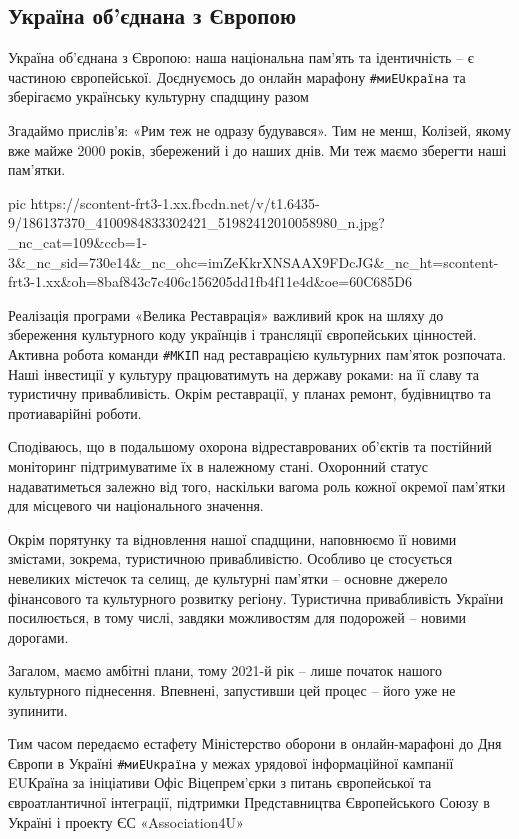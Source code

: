  
 
 
 
 
\subsection{Україна об'єднана з Європою}

Україна об'єднана з Європою: наша національна пам'ять та ідентичність – є
частиною європейської. Доєднуємось до онлайн марафону \verb|#миEUкраїна| та зберігаємо
українську культурну спадщину разом 

Згадаймо прислів'я: «Рим теж не одразу будувався». Тим не менш, Колізей, якому
вже майже 2000 років, збережений і до наших днів. Ми теж маємо зберегти наші
пам'ятки.

\ifcmt
  pic https://scontent-frt3-1.xx.fbcdn.net/v/t1.6435-9/186137370_4100984833302421_51982412010058980_n.jpg?_nc_cat=109&ccb=1-3&_nc_sid=730e14&_nc_ohc=imZeKkrXNSAAX9FDcJG&_nc_ht=scontent-frt3-1.xx&oh=8baf843c7c406c156205dd1fb4f11e4d&oe=60C685D6
\fi

Реалізація  програми «Велика Реставрація» важливий крок на шляху до збереження
культурного коду українців і трансляції європейських цінностей. Активна робота
команди \verb|#МКІП| над реставрацією культурних пам'яток розпочата. Наші інвестиції у
культуру працюватимуть на державу роками: на її славу та туристичну
привабливість. Окрім реставрації, у планах ремонт, будівництво та протиаварійні
роботи. 

Сподіваюсь, що в подальшому охорона відреставрованих об'єктів та постійний
моніторинг підтримуватиме їх в належному стані. Охоронний статус надаватиметься
залежно від того, наскільки вагома роль кожної окремої пам'ятки для місцевого
чи національного значення.

Окрім порятунку та відновлення нашої спадщини, наповнюємо її новими змістами,
зокрема, туристичною привабливістю. Особливо це стосується невеликих містечок
та селищ, де культурні пам'ятки – основне джерело фінансового та культурного
розвитку регіону. Туристична привабливість України посилюється, в тому числі,
завдяки можливостям для подорожей – новими дорогами.

Загалом, маємо амбітні плани, тому 2021-й рік – лише початок нашого культурного
піднесення. Впевнені, запустивши цей процес – його уже не зупинити.

Тим часом передаємо естафету Міністерство оборони в онлайн-марафоні до Дня
Європи в Україні \verb|#миEUкраїна| у межах урядової інформаційної кампанії EUКраїна
за ініціативи Офіс Віцепрем'єрки з питань європейської та євроатлантичної
інтеграції, підтримки Представництва Європейського Союзу в Україні і проекту ЄС
«Association4U»

